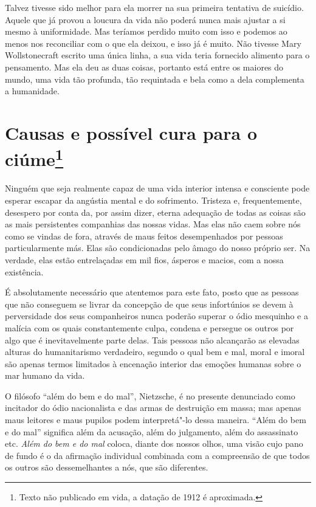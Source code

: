 Talvez tivesse sido melhor para ela morrer na sua primeira tentativa
de suicídio. Aquele que já provou a loucura da vida não poderá nunca mais
ajustar a si mesmo à uniformidade. Mas teríamos perdido muito com isso e
podemos ao menos nos reconciliar com o que ela deixou, e isso já é
muito. Não tivesse Mary Wollstonecraft escrito uma única linha, a sua
vida teria fornecido alimento para o pensamento. Mas ela deu as duas
coisas, portanto está entre os maiores do mundo, uma vida tão profunda,
tão requintada e bela como a dela complementa a humanidade.

\chapter{Causas e possível cura para o ciúme\footnote{Texto não publicado em
  vida, a datação de 1912 é aproximada.}}

Ninguém que seja realmente capaz de uma vida interior intensa e
consciente pode esperar escapar da angústia mental e do sofrimento.
Tristeza e, frequentemente, desespero por conta da, por assim dizer, eterna
adequação de todas as coisas são as mais persistentes companhias das
nossas vidas. Mas elas não caem sobre nós como se vindas de fora,
através de maus feitos desempenhados por pessoas particularmente más.
Elas são condicionadas pelo âmago do nosso próprio ser. Na verdade, elas
estão entrelaçadas em mil fios, ásperos e macios, com a nossa
existência.

É absolutamente necessário que atentemos para este fato, posto que as
pessoas que não conseguem se livrar da concepção de que seus infortúnios
se devem à perversidade dos seus companheiros nunca poderão superar o
ódio mesquinho e a malícia com os quais constantemente culpa, condena e
persegue os outros por algo que é inevitavelmente parte delas. Tais
pessoas não alcançarão as elevadas alturas do humanitarismo verdadeiro,
segundo o qual bem e mal, moral e imoral são apenas termos limitados à
encenação interior das emoções humanas sobre o mar humano da vida.

O filósofo ``além do bem e do mal'', Nietzsche, é no presente denunciado
como incitador do ódio nacionalista e das armas de destruição em massa;
mas apenas maus leitores e maus pupilos podem interpretá"-lo dessa
maneira. ``Além do bem e do mal'' significa além da acusação, além do
julgamento, além do assassinato etc. \emph{Além do bem e do mal} coloca, diante dos nossos olhos, uma visão cujo pano de fundo é o da afirmação
individual combinada com a compreensão de que todos os outros são
dessemelhantes a nós, que são diferentes.


